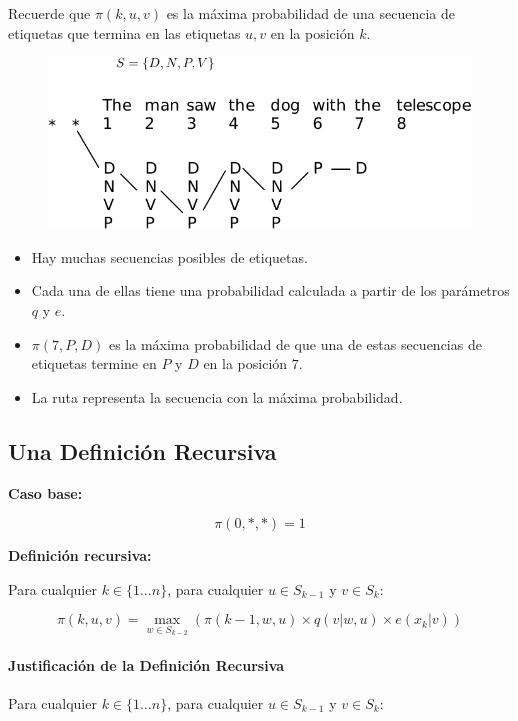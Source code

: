 Recuerde que $\pi(k, u, v)$ es la máxima probabilidad de una secuencia de etiquetas que termina en las etiquetas $u, v$ en la posición $k$.

\begin{figure}[h]
    \centering
    \includegraphics[scale = 0.6]{pics/viterbi1.pdf}
\end{figure}

\begin{itemize}
    \item Hay muchas secuencias posibles de etiquetas.
    \item Cada una de ellas tiene una probabilidad calculada a partir de los parámetros $q$ y $e$.
    \item $\pi(7, P, D)$ es la máxima probabilidad de que una de estas secuencias de etiquetas termine en $P$ y $D$ en la posición $7$.
    \item La ruta representa la secuencia con la máxima probabilidad.
\end{itemize}

\subsection{Una Definición Recursiva}

\textbf{Caso base:}

\[
\pi(0, *, *) = 1
\]

\textbf{Definición recursiva:}

Para cualquier $k \in \{1 \ldots n\}$, para cualquier $u \in S_{k-1}$ y $v \in S_k$:

\[
\pi(k, u, v) = \max_{w \in S_{k-2}} (\pi(k - 1, w, u) \times q(v|w, u) \times e(x_k|v))
\]

\paragraph{Justificación de la Definición Recursiva}

Para cualquier $k \in \{1 \ldots n\}$, para cualquier $u \in S_{k-1}$ y $v \in S_k$:

